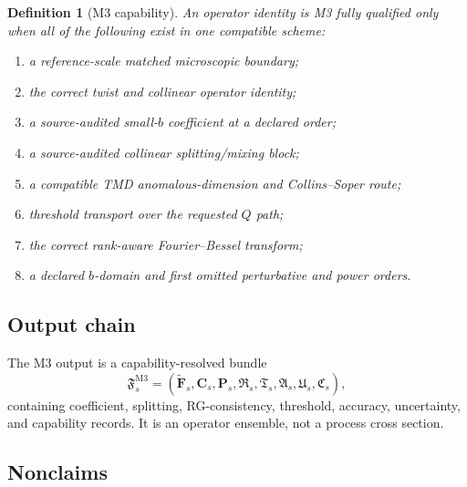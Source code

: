 \documentclass[11pt]{article}
\newtheorem{definition}{Definition}[section]
\begin{document}
\begin{definition}[M3 capability]
An operator identity is \emph{M3 fully qualified} only when all of the following exist in one compatible scheme:
\begin{enumerate}
\item a reference-scale matched microscopic boundary;
\item the correct twist and collinear operator identity;
\item a source-audited small-\(b\) coefficient at a declared order;
\item a source-audited collinear splitting/mixing block;
\item a compatible TMD anomalous-dimension and Collins--Soper route;
\item threshold transport over the requested \(Q\) path;
\item the correct rank-aware Fourier--Bessel transform;
\item a declared \(b\)-domain and first omitted perturbative and power orders.
\end{enumerate}
\end{definition}

\subsection{Output chain}

The M3 output is a capability-resolved bundle
\begin{equation}
 \mathfrak F_s^{\mathrm{M3}}
 =
 \left(
 \widetilde{\bm F}_s,
 \bm C_s,
 \bm P_s,
 \mathfrak R_s,
 \mathfrak T_s,
 \mathfrak A_s,
 \mathfrak U_s,
 \mathfrak C_s
 \right),
 \label{eq:m3-bundle}
\end{equation}
containing coefficient, splitting, RG-consistency, threshold, accuracy, uncertainty, and capability records.  It is an operator ensemble, not a process cross section.

\subsection{Nonclaims}
\end{document}
